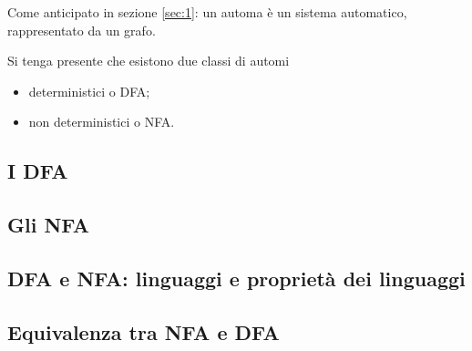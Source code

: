 \documentclass{subfiles}
\begin{document}
Come anticipato in sezione \eqref{sec:1}: un automa è un sistema automatico, rappresentato da un grafo.

\noindent Si tenga presente che esistono due classi di automi
\begin{itemize}
    \item deterministici o DFA;
    \item non deterministici o NFA.
\end{itemize}

\subsection{I DFA}


\subsection{Gli NFA}


\subsection{DFA e NFA: linguaggi e proprietà dei linguaggi}


\subsection{Equivalenza tra NFA e DFA}

\end{document}
